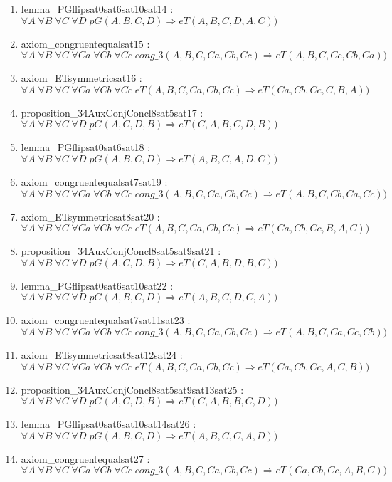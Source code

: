\documentclass{article}
\begin{document}
\begin{enumerate}
\item lemma\_PGflipsat0sat6sat10sat14 : $\forall A\;\forall B\;\forall C\;\forall D\;pG(A, B, C, D) \Rightarrow eT(A, B, C, D, A, C))$
\item axiom\_congruentequalsat15 : $\forall A\;\forall B\;\forall C\;\forall Ca\;\forall Cb\;\forall Cc\;cong\_3(A, B, C, Ca, Cb, Cc) \Rightarrow eT(A, B, C, Cc, Cb, Ca))$
\item axiom\_ETsymmetricsat16 : $\forall A\;\forall B\;\forall C\;\forall Ca\;\forall Cb\;\forall Cc\;eT(A, B, C, Ca, Cb, Cc) \Rightarrow eT(Ca, Cb, Cc, C, B, A))$
\item proposition\_34AuxConjConcl8sat5sat17 : $\forall A\;\forall B\;\forall C\;\forall D\;pG(A, C, D, B) \Rightarrow eT(C, A, B, C, D, B))$
\item lemma\_PGflipsat0sat6sat18 : $\forall A\;\forall B\;\forall C\;\forall D\;pG(A, B, C, D) \Rightarrow eT(A, B, C, A, D, C))$
\item axiom\_congruentequalsat7sat19 : $\forall A\;\forall B\;\forall C\;\forall Ca\;\forall Cb\;\forall Cc\;cong\_3(A, B, C, Ca, Cb, Cc) \Rightarrow eT(A, B, C, Cb, Ca, Cc))$
\item axiom\_ETsymmetricsat8sat20 : $\forall A\;\forall B\;\forall C\;\forall Ca\;\forall Cb\;\forall Cc\;eT(A, B, C, Ca, Cb, Cc) \Rightarrow eT(Ca, Cb, Cc, B, A, C))$
\item proposition\_34AuxConjConcl8sat5sat9sat21 : $\forall A\;\forall B\;\forall C\;\forall D\;pG(A, C, D, B) \Rightarrow eT(C, A, B, D, B, C))$
\item lemma\_PGflipsat0sat6sat10sat22 : $\forall A\;\forall B\;\forall C\;\forall D\;pG(A, B, C, D) \Rightarrow eT(A, B, C, D, C, A))$
\item axiom\_congruentequalsat7sat11sat23 : $\forall A\;\forall B\;\forall C\;\forall Ca\;\forall Cb\;\forall Cc\;cong\_3(A, B, C, Ca, Cb, Cc) \Rightarrow eT(A, B, C, Ca, Cc, Cb))$
\item axiom\_ETsymmetricsat8sat12sat24 : $\forall A\;\forall B\;\forall C\;\forall Ca\;\forall Cb\;\forall Cc\;eT(A, B, C, Ca, Cb, Cc) \Rightarrow eT(Ca, Cb, Cc, A, C, B))$
\item proposition\_34AuxConjConcl8sat5sat9sat13sat25 : $\forall A\;\forall B\;\forall C\;\forall D\;pG(A, C, D, B) \Rightarrow eT(C, A, B, B, C, D))$
\item lemma\_PGflipsat0sat6sat10sat14sat26 : $\forall A\;\forall B\;\forall C\;\forall D\;pG(A, B, C, D) \Rightarrow eT(A, B, C, C, A, D))$
\item axiom\_congruentequalsat27 : $\forall A\;\forall B\;\forall C\;\forall Ca\;\forall Cb\;\forall Cc\;cong\_3(A, B, C, Ca, Cb, Cc) \Rightarrow eT(Ca, Cb, Cc, A, B, C))$

\end{enumerate}
\end{document}
